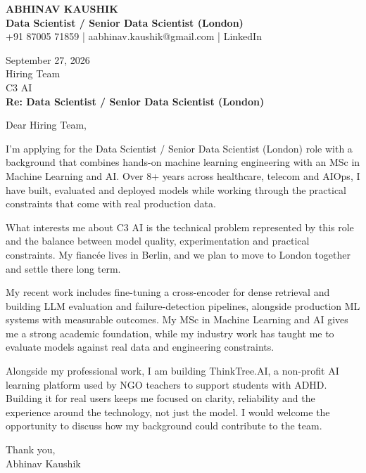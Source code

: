 \documentclass[10pt,a4paper]{article}
\begin{document}
\begin{center}
{\Large\bfseries ABHINAV KAUSHIK}\\[2pt]
{\bfseries Data Scientist / Senior Data Scientist (London)}\\[2pt]
+91 87005 71859 \quad | \quad aabhinav.kaushik@gmail.com \quad | \quad LinkedIn
\end{center}
\vspace{8pt}
September 27, 2026\\[6pt]
Hiring Team\\
C3 AI\\[4pt]
\textbf{Re: Data Scientist / Senior Data Scientist (London)}

Dear Hiring Team,

I’m applying for the Data Scientist / Senior Data Scientist (London) role with a background that combines hands-on machine learning engineering with an MSc in Machine Learning and AI. Over 8+ years across healthcare, telecom and AIOps, I have built, evaluated and deployed models while working through the practical constraints that come with real production data.

What interests me about C3 AI is the technical problem represented by this role and the balance between model quality, experimentation and practical constraints. My fiancée lives in Berlin, and we plan to move to London together and settle there long term.

My recent work includes fine-tuning a cross-encoder for dense retrieval and building LLM evaluation and failure-detection pipelines, alongside production ML systems with measurable outcomes. My MSc in Machine Learning and AI gives me a strong academic foundation, while my industry work has taught me to evaluate models against real data and engineering constraints.

Alongside my professional work, I am building ThinkTree.AI, a non-profit AI learning platform used by NGO teachers to support students with ADHD. Building it for real users keeps me focused on clarity, reliability and the experience around the technology, not just the model. I would welcome the opportunity to discuss how my background could contribute to the team.

Thank you,\\
Abhinav Kaushik
\end{document}

